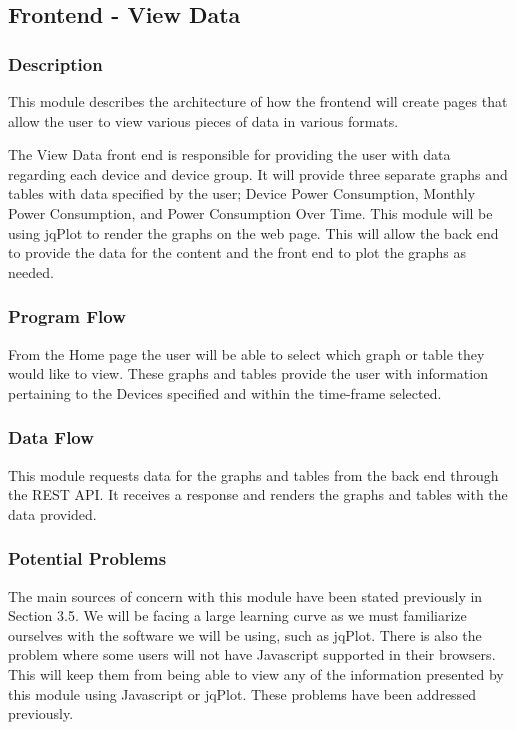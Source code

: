 
\subsection{Frontend - View Data}

\subsubsection{Description}

This module describes the architecture of how the frontend will create pages that allow the user to view various pieces of data in various formats.

The View Data front end is responsible for providing the user with data regarding each device and device group. 
It will provide three separate graphs and tables with data specified by the user; 
Device Power Consumption, Monthly Power Consumption, and Power Consumption Over Time. 
This module will be using jqPlot to render the graphs on the web page. 
This will allow the back end to provide the data for the content and the front end to plot the graphs as needed. 


\subsubsection{Program Flow}

From the Home page the user will be able to select which graph or table they would like to view.  
These graphs and tables provide the user with information pertaining to the Devices specified and within the time-frame selected.  

\subsubsection{Data Flow}

This module requests data for the graphs and tables from the back end through the REST API. 
It receives a response and renders the graphs and tables with the data provided. 

\subsubsection{Potential Problems}

The main sources of concern with this module have been stated previously in Section 3.5. 
We will be facing a large learning curve as we must familiarize ourselves with the software we will be using, such as jqPlot. 
There is also the problem where some users will not have Javascript supported in their browsers. 
This will keep them from being able to view any of the information presented by this module using Javascript or jqPlot. 
These problems have been addressed previously. 
